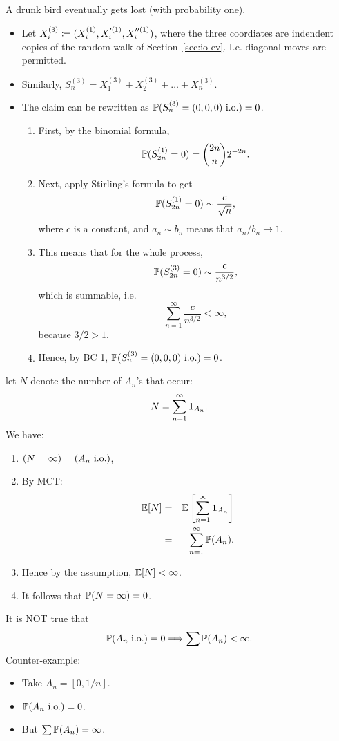 \documentclass{article}
\begin{document}
 A drunk bird eventually gets lost (with probability one).
\begin{itemize}
  \item Let $X_i^{(3)} \defeq (X^{(1)}_i, X'^{(1)}_i, X''^{(1)}_i)$, where the three coordiates are indendent copies of the random walk of Section~\ref{sec:io-ev}. I.e. diagonal moves are permitted.
  \item Similarly, $S_n^{(3)} = X_1^{(3)} + X_2^{(3)} + \dots + X_n^{(3)}$.
  \item The claim can be rewritten as $\P(S^{(3)}_n = (0,0,0)\io) = 0$.
  \begin{enumerate}
    \item First, by the binomial formula, \[\P(S^{(1)}_{2n} = 0) = \binom{2n}{n} 2^{-2n}.\]
    \item Next, apply Stirling's formula to get \[\P(S^{(1)}_{2n} = 0)  \sim \frac{c}{\sqrt{n}},\] where $c$ is a constant, and $a_n \sim b_n$ means that $a_n/b_n \to 1$.
    \item This means that for the whole process,  \[\P(S^{(3)}_{2n} = 0)  \sim \frac{c}{n^{3/2}},\] which is summable, i.e. \[ \sum_{n=1}^\infty \frac{c}{n^{3/2}} < \infty,\] because $3/2 > 1$.
    \item Hence, by BC 1, $\P(S^{(3)}_n = (0,0,0)\io) = 0$.
  \end{enumerate}
\end{itemize}

 let $N$ denote the number of $A_n$'s that occur: \[ N = \sum_{n=1}^\infty \1_{A_n}. \]We have:
\begin{enumerate}
  \item $(N = \infty) = (A_n\io)$,
  \item By MCT: 
\begin{eqnarray*}
\E[N] &=& \E\left[\sum_{n=1}^\infty \1_{A_n}\right] \\
&=& \sum_{n=1}^\infty \P(A_n).
\end{eqnarray*} 
  \item Hence by the assumption, $\E[N] < \infty$.
  \item It follows that $\P(N = \infty) = 0$.
\end{enumerate}

 It is NOT true that \[ \P(A_n\io) = 0 \Longrightarrow \sum \P(A_n) < \infty. \] Counter-example:
\begin{itemize}
  \item Take $A_n = [0, 1/n]$.
  \item $\P(A_n \io) = 0$.
  \item But $\sum \P(A_n) = \infty$.
\end{itemize}
\end{document}
